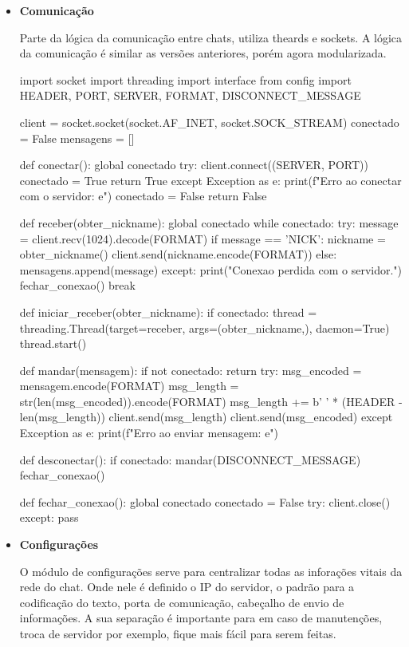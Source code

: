 	\begin{itemize}
		\item \textbf{Comunicação}
		
		Parte da lógica da comunicação entre chats, utiliza theards e sockets. A lógica da comunicação é similar as versões anteriores, porém agora modularizada. 
		
		\begin{pycode}
			import socket
			import threading
			import interface 
			from config import HEADER, PORT, SERVER, FORMAT, DISCONNECT_MESSAGE
			
			client = socket.socket(socket.AF_INET, socket.SOCK_STREAM)
			conectado = False
			mensagens = []
			
			def conectar():
			global conectado
			try:
			client.connect((SERVER, PORT))
			conectado = True
			return True
			except Exception as e:
			print(f"Erro ao conectar com o servidor: {e}")
			conectado = False
			return False
			
			def receber(obter_nickname):
			global conectado
			while conectado:
			try:
			message = client.recv(1024).decode(FORMAT)
			if message == 'NICK':
			nickname = obter_nickname()
			client.send(nickname.encode(FORMAT))
			else:
			mensagens.append(message)
			except:
			print("Conexao perdida com o servidor.")
			fechar_conexao()
			break
			
			def iniciar_receber(obter_nickname):
			if conectado:
			thread = threading.Thread(target=receber, args=(obter_nickname,), daemon=True)
			thread.start()
			
			def mandar(mensagem):
			if not conectado:
			return
			try:
			msg_encoded = mensagem.encode(FORMAT)
			msg_length = str(len(msg_encoded)).encode(FORMAT)
			msg_length += b' ' * (HEADER - len(msg_length))
			client.send(msg_length)
			client.send(msg_encoded)
			except Exception as e:
			print(f"Erro ao enviar mensagem: {e}")
			
			def desconectar():
			if conectado:
			mandar(DISCONNECT_MESSAGE)
			fechar_conexao()
			
			def fechar_conexao():
			global conectado
			conectado = False
			try:
			client.close()
			except:
			pass
		\end{pycode}
		
		\item \textbf{Configurações}
		
		O módulo de configurações serve para centralizar todas as inforações vitais da rede do chat. Onde nele é definido o IP do servidor, o padrão para a codificação do texto, porta de comunicação, cabeçalho de envio de informações. A sua separação é importante para em caso de manutenções, troca de servidor por exemplo, fique mais fácil para serem feitas.
		

\end{itemize}
